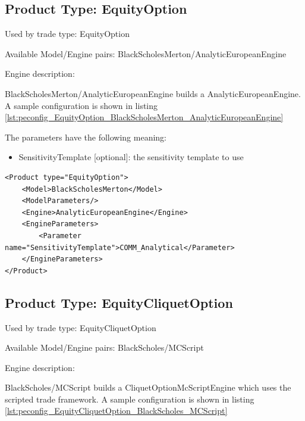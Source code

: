 \subsection{Product Type: EquityOption}

Used by trade type: EquityOption

Available Model/Engine pairs: BlackScholesMerton/AnalyticEuropeanEngine

Engine description:

BlackScholesMerton/AnalyticEuropeanEngine builds a AnalyticEuropeanEngine. A sample configuration is shown in listing
\ref{lst:peconfig_EquityOption_BlackScholesMerton_AnalyticEuropeanEngine}

The parameters have the following meaning:

\begin{itemize}
\item SensitivityTemplate [optional]: the sensitivity template to use
\end{itemize}

\begin{longlisting}
\begin{verbatim}
<Product type="EquityOption">
    <Model>BlackScholesMerton</Model>
    <ModelParameters/>
    <Engine>AnalyticEuropeanEngine</Engine>
    <EngineParameters>
        <Parameter name="SensitivityTemplate">COMM_Analytical</Parameter>
    </EngineParameters>
</Product>
\end{verbatim}
\caption{Configuration for Product EquityOption, Model BlackScholesMerton, Engine AnalyticEuropeanEngine}
\label{lst:peconfig_EquityOption_BlackScholesMerton_AnalyticEuropeanEngine}
\end{longlisting}

\subsection{Product Type: EquityCliquetOption}

Used by trade type: EquityCliquetOption

Available Model/Engine pairs: BlackScholes/MCScript

Engine description:

BlackScholes/MCScript builds a CliquetOptionMcScriptEngine which uses the scripted trade framework. A sample
configuration is shown in listing \ref{lst:peconfig_EquityCliquetOption_BlackScholes_MCScript}

